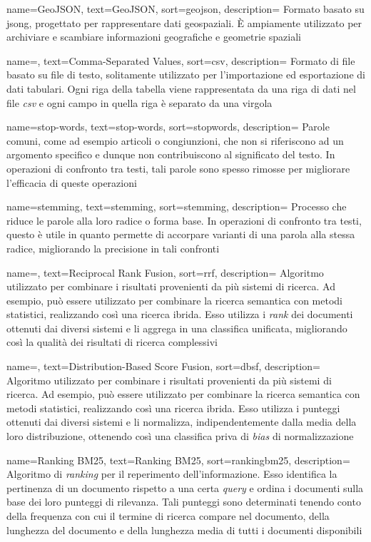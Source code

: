 {
    name=GeoJSON,
    text=GeoJSON,
    sort=geojson,
    description=
    {Formato basato su \gls{jsong}, progettato per rappresentare dati geospaziali.
    È ampiamente utilizzato per archiviare e scambiare informazioni geografiche e geometrie spaziali}
}

 {
    name=,
    text=Comma-Separated Values,
    sort=csv,
    description=
    {Formato di file basato su file di testo, solitamente utilizzato per l'importazione ed esportazione di dati tabulari.
    Ogni riga della tabella viene rappresentata da una riga di dati nel file \emph{csv} e ogni campo in quella riga è separato da una virgola}
}

 {
    name=stop-words,
    text=stop-words,
    sort=stopwords,
    description=
        {Parole comuni, come ad esempio articoli o congiunzioni, 
        che non si riferiscono ad un argomento specifico e dunque non contribuiscono al significato del testo.
        In operazioni di confronto tra testi, tali parole sono spesso rimosse per migliorare l'efficacia di queste operazioni}
}

 {
    name=stemming,
    text=stemming,
    sort=stemming,
    description=
        {Processo che riduce le parole alla loro radice o forma base.
        In operazioni di confronto tra testi, questo è utile in quanto permette di accorpare varianti di una parola alla stessa radice, 
        migliorando la precisione in tali confronti}
}

 {
    name=,
    text=Reciprocal Rank Fusion,
    sort=rrf,
    description=
        {Algoritmo utilizzato per combinare i risultati provenienti da più sistemi di ricerca. Ad esempio, può essere utilizzato per combinare la ricerca semantica con metodi statistici, realizzando così una ricerca ibrida. 
        Esso utilizza i \emph{rank} dei documenti ottenuti dai diversi sistemi e li aggrega in una classifica unificata, migliorando così la qualità dei risultati di ricerca complessivi}
}

 {
    name=,
    text=Distribution-Based Score Fusion,
    sort=dbsf,
    description=
        {Algoritmo utilizzato per combinare i risultati provenienti da più sistemi di ricerca. Ad esempio, può essere utilizzato per combinare la ricerca semantica con metodi statistici, realizzando così una ricerca ibrida. 
        Esso utilizza i punteggi ottenuti dai diversi sistemi e li normalizza, indipendentemente dalla media della loro distribuzione, ottenendo così una classifica priva di \emph{bias} di normalizzazione}
}

 {
    name=Ranking BM25,
    text=Ranking BM25,
    sort=rankingbm25,
    description=
        {Algoritmo di \emph{ranking} per il reperimento dell'informazione.
        Esso identifica la pertinenza di un documento rispetto a una certa \emph{query} e ordina i documenti sulla base dei loro punteggi di rilevanza. Tali punteggi sono determinati tenendo conto della frequenza con cui il termine 
        di ricerca compare nel documento, della lunghezza del documento e della lunghezza media di tutti i documenti disponibili}
}